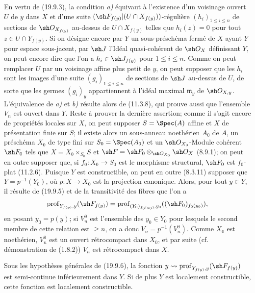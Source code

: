 En vertu de (19.9.3), la condition \emph{a)} équivaut à l'existence d'un voisinage ouvert $U$ de $y$ dans $X$ et d'une suite $(\sh F_{f(y)}|(U\cap X_{f(y)}))$-régulière $(h_i)_{1\leq i\leq n}$ de sections de $\sh O_{X_{f(y)}}$ au-dessus de $U\cap X_{f(y)}$ telles que $h_i(z)=0$ pour tout $z\in U\cap Y_{f(y)}$. Si on désigne encore par $Y$ un sous-préschéma fermé de $X$ ayant $Y$ pour espace sous-jacent, par $\sh J$ l'Idéal quasi-cohérent de $\sh O_X$ définissant $Y$, on peut encore dire que l'on a $h_i\in\sh J_{f(y)}$ pour $1\leq i\leq n$. Comme on peut remplacer $U$ par un voisinage affine plus petit de $y$, on peut supposer que les $h_i$ sont les images d'une suite $(g_i)_{1\leq i\leq n}$ de sections de $\sh J$ au-dessus de $U$, de sorte que les germes $(g_i)_y$ appartiennent à l'idéal maximal $\mathfrak m_y$ de $\sh O_{X,y}$. L'équivalence de \emph{a)} et \emph{b)} résulte alors de (11.3.8), qui prouve aussi que l'ensemble $V_n$ est ouvert dans $Y$.
Reste à prouver la dernière assertion; comme il s'agit encore de propriétés locales sur $X$, on peut supposer $S=\Spec(A)$ affine et $X$ de présentation finie sur $S$; il existe alors un sous-anneau noethérien $A_0$ de $A$, un préschéma $X_0$ de type fini sur $S_0=\Spec(A_0)$ et un $\sh O_{X_0}$-Module cohérent $\sh F_0$ tels que $X=X_0\times_{S_0}S$ et $\sh F=\sh F_0\otimes_{\sh O_{X_0}}\sh O_X$ (8.9.1); on peut en outre supposer que, si $f_0:X_0\to S_0$ est le morphisme structural, $\sh F_0$ est $f_0$-plat (11.2.6). Puisque $Y$ est constructible, on peut en outre (8.3.11) supposer
que $Y=p^{-1}(Y_0)$, où $p:X\to X_0$ est la projection canonique. Alors, pour tout $y\in Y$, il résulte de (19.9.5) et de la transitivité des fibres que l'on a
\[
  \operatorname{prof}_{Y_{f(y)},y}(\sh F_{f(y)})
  =\operatorname{prof}_{(Y_0)_{f_0(y_0)},y_0}((\sh F_0)_{f_0(y_0)}),
\]
en posant $y_0=p(y)$; si $V_n^0$ est l'ensemble des $y_0\in Y_0$ pour lesquels le second membre de cette relation est $\geq n$, on a donc $V_n=p^{-1}(V_n^0)$. Comme $X_0$ est noethérien, $V_n^0$ est un ouvert rétrocompact dans $X_0$, et par suite (cf. démonstration de (1.8.2)) $V_n$ est rétrocompact dans $X$.

\begin{corollary}[19.9.7]
\label{IV.19.9.7}
Sous les hypothèses générales de \textup{(19.9.6)}, la fonction $y\leadsto\operatorname{prof}_{Y_{f(y)},y}(\sh F_{f(y)})$ est semi-continue inférieurement dans $Y$. Si de plus $Y$ est localement constructible, cette fonction est localement constructible.
\end{corollary}

